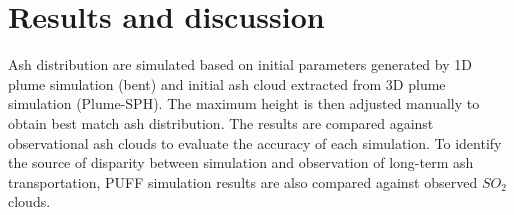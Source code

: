 \section{Results and discussion}

Ash distribution are simulated based on initial parameters generated by 1D plume simulation (bent) and initial ash cloud extracted from 3D plume simulation (Plume-SPH). The maximum height is then adjusted manually to obtain best match ash distribution. The results are compared against observational ash clouds to evaluate the accuracy of each simulation. To identify the source of disparity between simulation and observation of long-term ash transportation, PUFF simulation results are also compared against observed $SO_2$ clouds.


